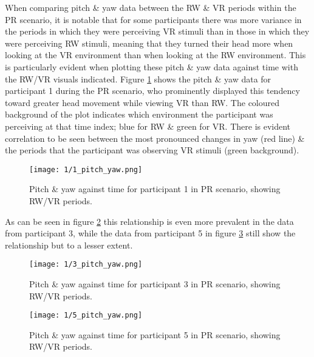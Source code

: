 When comparing pitch \& yaw data between the RW \& VR periods within the PR scenario, it is notable that for some participants there was more variance in the periods in which they were perceiving VR stimuli than in those in which they were perceiving RW stimuli, meaning that they turned their head more when looking at the VR environment than when looking at the RW environment. This is particularly evident when plotting these pitch \& yaw data against time with the RW/VR visuals indicated. Figure \ref{1_pitch_yaw.png} shows the pitch \& yaw data for participant 1 during the PR scenario, who prominently displayed this tendency toward greater head movement while viewing VR than RW. The coloured background of the plot indicates which environment the participant was perceiving at that time index; blue for RW \& green for VR. There is evident correlation to be seen between the most pronounced changes in yaw (red line) \& the periods that the participant was observing VR stimuli (green background).

\begin{figure}[h]
	\begin{center}
	\texttt{[image: 1/1\_pitch\_yaw.png]}
	\caption{Pitch \& yaw against time for participant 1 in PR scenario, showing RW/VR periods.}
	\label{1_pitch_yaw.png}
	\end{center}
\end{figure}

As can be seen in figure \ref{3_pitch_yaw.png} this relationship is even more prevalent in the data from participant 3, while the data from participant 5 in figure \ref{5_pitch_yaw.png} still show the relationship but to a lesser extent.

\begin{figure}[h]
	\begin{center}
	\texttt{[image: 1/3\_pitch\_yaw.png]}
	\caption{Pitch \& yaw against time for participant 3 in PR scenario, showing RW/VR periods.}
	\label{3_pitch_yaw.png}
	\end{center}
\end{figure}

\begin{figure}[h]
	\begin{center}
	\texttt{[image: 1/5\_pitch\_yaw.png]}
	\caption{Pitch \& yaw against time for participant 5 in PR scenario, showing RW/VR periods.}
	\label{5_pitch_yaw.png}
	\end{center}
\end{figure}

